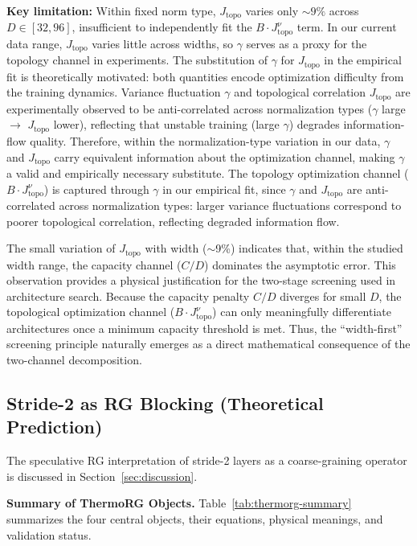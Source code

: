 \documentclass[11pt, a4paper]{article}
\theoremstyle{plain}
\begin{document}
\textbf{Key limitation:} Within fixed norm type, $J_{\mathrm{topo}}$ varies only $\sim 9\%$ across $D \in [32, 96]$, insufficient to independently fit the $B \cdot J_{\mathrm{topo}}^{\nu}$ term. In our current data range, $J_{\mathrm{topo}}$ varies little across widths, so $\gamma$ serves as a proxy for the topology channel in experiments. The substitution of $\gamma$ for $J_{\mathrm{topo}}$ in the empirical fit is theoretically motivated: both quantities encode optimization difficulty from the training dynamics. Variance fluctuation $\gamma$ and topological correlation $J_{\mathrm{topo}}$ are experimentally observed to be anti-correlated across normalization types ($\gamma$ large $\rightarrow$ $J_{\mathrm{topo}}$ lower), reflecting that unstable training (large $\gamma$) degrades information-flow quality. Therefore, within the normalization-type variation in our data, $\gamma$ and $J_{\mathrm{topo}}$ carry equivalent information about the optimization channel, making $\gamma$ a valid and empirically necessary substitute. The topology optimization channel ($B \cdot J_{\mathrm{topo}}^{\nu}$) is captured through $\gamma$ in our empirical fit, since $\gamma$ and $J_{\mathrm{topo}}$ are anti-correlated across normalization types: larger variance fluctuations correspond to poorer topological correlation, reflecting degraded information flow.

The small variation of $J_{\mathrm{topo}}$ with width ($\sim$9\%) indicates that, within the studied width range, the capacity channel ($C/D$) dominates the asymptotic error. This observation provides a physical justification for the two-stage screening used in architecture search. Because the capacity penalty $C/D$ diverges for small $D$, the topological optimization channel ($B \cdot J_{\mathrm{topo}}^\nu$) can only meaningfully differentiate architectures once a minimum capacity threshold is met. Thus, the ``width-first'' screening principle naturally emerges as a direct mathematical consequence of the two-channel decomposition.

\subsection{Stride-2 as RG Blocking (Theoretical Prediction)}
The speculative RG interpretation of stride-2 layers as a coarse-graining operator is discussed in Section~\ref{sec:discussion}.

\medskip
\noindent\textbf{Summary of ThermoRG Objects.} Table~\ref{tab:thermorg-summary} summarizes the four central objects, their equations, physical meanings, and validation status.
\end{document}
